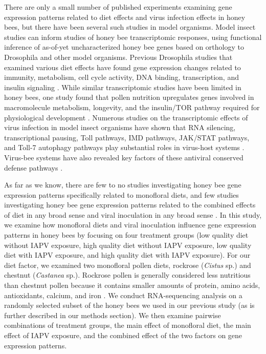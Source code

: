\documentclass{bmcart}
\begin{document}
\begin{linenumbers}
\begin{doublespacing}
There are only a small number of published experiments examining gene expression patterns related to diet effects \cite{alaux2} and virus infection effects \cite{galbraith} in honey bees, but there have been several such studies in model organisms. Model insect studies can inform studies of honey bee transcriptomic responses, using functional inference of as-of-yet uncharacterized honey bee genes based on orthology to Drosophila and other model organisms. Previous Drosophila studies that examined various diet effects have found gene expression changes related to immunity, metabolism, cell cycle activity, DNA binding, transcription, and insulin signaling \cite{sugarFat, sugarProtein, jHormone, alaux2}. While similar transcriptomic studies have been limited in honey bees, one study found that pollen nutrition upregulates genes involved in macromolecule metabolism, longevity, and the insulin/TOR pathway required for physiological development \cite{alaux2}. Numerous studies on the transcriptomic effects of virus infection in model insect organisms have shown that RNA silencing, transcriptional pausing, Toll pathways, IMD pathways, JAK/STAT pathways, and Toll-7 autophagy pathways play substantial roles in virus-host systems \cite{cherryReview, swevers}. Virus-bee systems have also revealed key factors of these antiviral conserved defense pathways \cite{McMenamin}.

As far as we know, there are few to no studies investigating honey bee gene expression patterns specifically related to monofloral diets, and few studies investigating honey bee gene expression patterns related to the combined effects of diet in any broad sense and viral inoculation in any broad sense \cite{interactingDV}. In this study, we examine how monofloral diets and viral inoculation influence gene expression patterns in honey bees by focusing on four treatment groups (low quality diet without IAPV exposure, high quality diet without IAPV exposure, low quality diet with IAPV exposure, and high quality diet with IAPV exposure). For our diet factor, we examined two monofloral pollen diets, rockrose (\textit{Cistus} sp.) and chestnut (\textit{Castanea} sp.). Rockrose pollen is generally considered less nutritious than chestnut pollen because it contains smaller amounts of protein, amino acids, antioxidants, calcium, and iron \cite{adamInt, DiPasquale}. We conduct RNA-sequencing analysis on a randomly selected subset of the honey bees we used in our previous study (as is further described in our methods section). We then examine pairwise combinations of treatment groups, the main effect of monofloral diet, the main effect of IAPV exposure, and the combined effect of the two factors on gene expression patterns.


\end{doublespacing}
\end{linenumbers}
\end{document}
